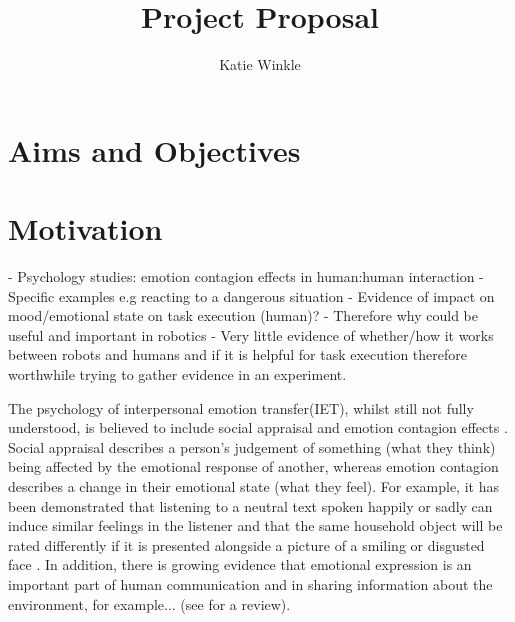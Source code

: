 \documentclass[]{article}
\title{Project Proposal}
\author{Katie Winkle}
\begin{document}
\maketitle

\begin{abstract}

\end{abstract}

\section{Aims and Objectives}


\section{Motivation}
- Psychology studies: emotion contagion effects in human:human interaction
- Specific examples e.g reacting to a dangerous situation
- Evidence of impact on mood/emotional state on task execution (human)?
- Therefore why could be useful and important in robotics
- Very little evidence of whether/how it works between robots and humans and if it is helpful for task execution therefore worthwhile trying to gather evidence in an experiment. 

The psychology of interpersonal emotion transfer(IET), whilst still not fully understood, is believed to include social appraisal and emotion contagion effects \cite{parkinson2011interpersonal}. Social appraisal describes a person's judgement of something (what they think) being affected by the emotional response of another, whereas emotion contagion describes a change in their emotional state (what they feel). For example, it has been demonstrated that listening to a neutral text spoken happily or sadly can induce similar feelings in the listener \cite{neumann2000mood} and that the same household object will be rated differently if it is presented alongside a picture of a smiling or disgusted face \cite{bayliss2007affective}. In addition, there is growing evidence that emotional expression is an important part of human communication and in sharing information about the environment, for example... (see \cite{tracy2015nonverbal} for a review). 
\end{document}
